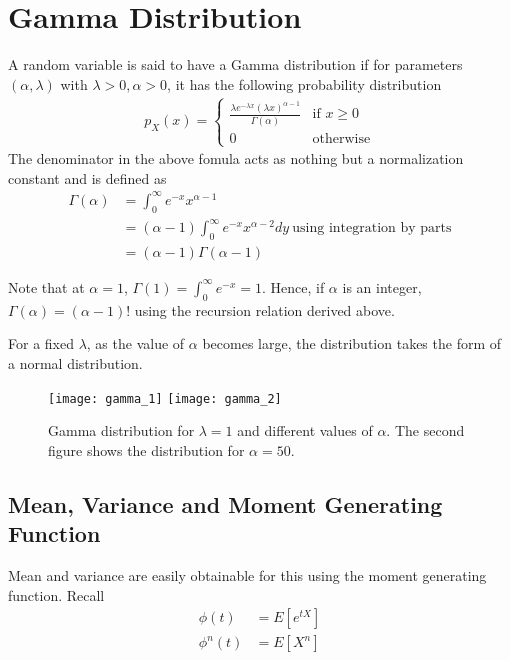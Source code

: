 \documentclass[../probability-notes.tex]{subfiles}
\begin{document}
    \section{Gamma Distribution}
    A random variable is said to have a Gamma distribution if for parameters $(\alpha, \lambda)$ with $\lambda > 0, \alpha > 0$, it has the following probability distribution
    \begin{align*}
        p_{X}(x) = \begin{cases}
            \frac{\lambda e^{-\lambda x} (\lambda x)^{\alpha - 1}}{\Gamma(\alpha)} &\mbox{if $x \geq 0$}\\
            0 &\mbox{otherwise}
        \end{cases}
    \end{align*}
    The denominator in the above fomula acts as nothing but a normalization constant and is defined as
    \begin{align*}
        \Gamma (\alpha) &= \int_{0}^{\infty} e^{-x} x^{\alpha - 1}\\
        &= (\alpha - 1) \int_{0}^{\infty} e^{-x} x^{\alpha - 2} dy \:\text{using integration by parts}\\
        &= (\alpha - 1) \Gamma (\alpha - 1)
    \end{align*}

    Note that at $\alpha = 1$, $\Gamma (1) = \int_{0}^{\infty} e^{-x} = 1$. Hence, if $\alpha$ is an integer, $\Gamma(\alpha) = (\alpha-1) !$ using the recursion relation derived above.\newline

    For a fixed $\lambda$, as the value of $\alpha$ becomes large, the distribution takes the form of a normal distribution.

    \begin{figure}[h]
    \texttt{[image: gamma\_1]}
    \texttt{[image: gamma\_2]}
    \centering
    \caption{Gamma distribution for $\lambda = 1$ and different values of $\alpha$. The second figure shows the distribution for $\alpha = 50$.}
    \label{fig:gamma_1} %
    \end{figure}

    \subsection{Mean, Variance and Moment Generating Function}
    Mean and variance are easily obtainable for this using the moment generating function. Recall
    \begin{align*}
        \phi(t) &= E[e^{tX}]\\
        \phi^{n}(t) &= E[X^{n}]
    \end{align*}
\end{document}

